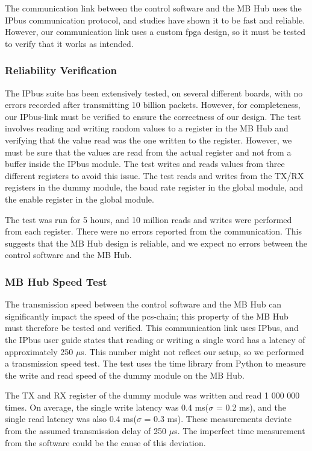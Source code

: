 \documentclass[main.tex]{subfiles}
\begin{document}
The communication link between the control software and the MB Hub uses the IPbus communication protocol, and studies have shown it to be fast and reliable\cite{IPbus}. However, our communication link uses a custom \gls{fpga} design, so it must be tested to verify that it works as intended.


\subsubsection{Reliability Verification}

The IPbus suite has been extensively tested, on several different boards, with no errors recorded after transmitting 10 billion packets\cite{IPbus}. However, for completeness, our IPbus-link must be verified to ensure the correctness of our design. The test involves reading and writing random values to a register in the MB Hub and verifying that the value read was the one written to the register. However, we must be sure that the values are read from the actual register and not from a buffer inside the IPbus module. The test writes and reads values from three different registers to avoid this issue. The test reads and writes from the TX/RX registers in the dummy module, the baud rate register in the global module, and the enable register in the global module.

The test was run for 5 hours, and 10 million reads and writes were performed from each register. There were no errors reported from the communication. This suggests that the MB Hub design is reliable, and we expect no errors between the control software and the MB Hub.

\subsubsection{MB Hub Speed Test}

The transmission speed between the control software and the MB Hub can significantly impact the speed of the \gls{pcs}-chain; this property of the MB Hub must therefore be tested and verified. This communication link uses IPbus, and the IPbus user guide states that reading or writing a single word has a latency of approximately 250 $\mu$s\cite{ipbus_guide}. This number might not reflect our setup, so we performed a transmission speed test. The test uses the time library from Python to measure the write and read speed of the dummy module on the MB Hub.

The TX and RX register of the dummy module was written and read 1 000 000 times. On average, the single write latency was 0.4 ms($\sigma$ = 0.2 ms), and the single read latency was also 0.4 ms($\sigma$ = 0.3 ms). These measurements deviate from the assumed transmission delay of 250 $\mu$s. The imperfect time measurement from the software could be the cause of this deviation.
\end{document}
